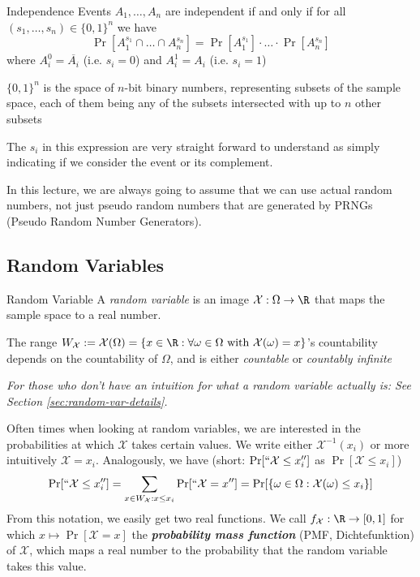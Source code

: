 \begin{lemma}[]{Independence}
    Events $A_1, \ldots, A_n$ are independent if and only if for all $(s_1, \ldots, s_n) \in \{0, 1\}^n$ we have
    \[
        \Pr[A_1^{s_1} \cap \ldots \cap A_n^{s_n}] = \Pr[A_1^{s_1}] \cdot \ldots \cdot \Pr[A_n^{s_n}]
    \]
    where $A_i^{0} = \overline{A_i}$ (i.e. $s_i = 0$) and $A_i^{1} = A_i$ (i.e. $s_i = 1$)
\end{lemma}
$\{0, 1\}^n$ is the space of $n$-bit binary numbers, representing subsets of the sample space, each of them being any of the subsets intersected with up to $n$ other subsets

The $s_i$ in this expression are very straight forward to understand as simply indicating if we consider the event or its complement. 


In this lecture, we are always going to assume that we can use actual random numbers, not just pseudo random numbers that are generated by PRNGs (Pseudo Random Number Generators).

\newsection
\subsection{Random Variables}
\setcounter{all}{25}
\begin{definition}[]{Random Variable}
    A \textit{random variable} is an image $\mathcal{X}: \Omega \rightarrow \R$ that maps the sample space to a real number.

    The range $W_{\mathcal{X}} := \mathcal{X}(\Omega) = \{ x \in \R : \forall \omega \in \Omega \text{ with } \mathcal{X}(\omega) = x \}$'s countability depends on the countability of $\Omega$, and is either \textit{countable} or \textit{countably infinite}
\end{definition}

\begin{scriptsize}
    \textit{For those who don't have an intuition for what a random variable actually is: See Section \ref{sec:random-var-details}.}
\end{scriptsize}

Often times when looking at random variables, we are interested in the probabilities at which $\mathcal{X}$ takes certain values.
We write either $\mathcal{X}^{-1}(x_i)$ or more intuitively $\mathcal{X} = x_i$. Analogously, we have (short: $\Pr[``\mathcal{X} \leq x_i'']$ as $\Pr[\mathcal{X} \leq x_i]$)
\[
    \Pr[``\mathcal{X} \leq x_i''] = \sum_{x \in W_{\mathcal{X}} : x \leq x_i} \Pr[``\mathcal{X} = x''] = \Pr[\{ \omega \in \Omega : \mathcal{X}(\omega) \leq x_i \}]
\]
From this notation, we easily get two real functions.
We call $f_{\mathcal{X}}: \R \rightarrow [0, 1]$ for which $x \mapsto \Pr[\mathcal{X} = x]$ the \textbf{\textit{probability mass function}} (PMF, Dichtefunktion) of $\mathcal{X}$, which maps a real number to the probability that the random variable takes this value.

